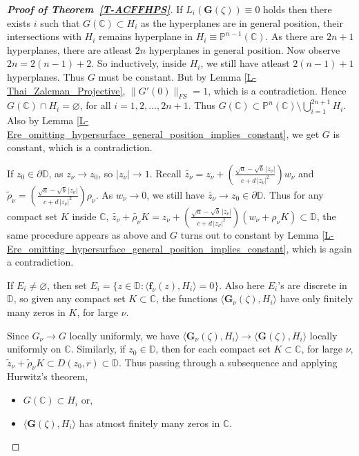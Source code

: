 \documentclass[10pt,a4paper]{amsart}
\begin{document}
\begin{proof}[{\bf Proof of Theorem~\ref{T-ACFFHPS}}]
If $L_i(\mathbf{G}(\zeta))\equiv 0$ holds then there exists $i$ such that $G(\mathbb C)\subset H_i$ as 
the hyperplanes are in general position, their intersections with $H_i$ 
remains hyperplane in $H_i\equiv\mathbb P^{n-1}(\mathbb C)$. As there are $2n+1$ hyperplanes, there are atleast $2n$ hyperplanes in general position. Now observe 
$2n=2(n-1)+2$. So inductively, inside $H_i$, we still have atleast $2(n-1)+1$ hyperplanes. Thus $G$ must be constant. But by Lemma \ref{L-Thai_Zalcman_Projective}, 
$\|G'(0)\|_{FS}=1$, which is a contradiction. Hence $G(\mathbb C)\cap H_i=\varnothing$, for all $i=1,2,\dots,2n+1$.
Thus $G(\mathbb C)\subset \mathbb P^n(\mathbb C)\setminus \bigcup_{i=1}^{2n+1}H_i$. Also by Lemma \ref{L-Ere_omitting_hypersurface_general_position_implies_constant}, we get $G$ is constant, which is a contradiction. \smallskip

If $z_0\in\partial\mathbb D$, as $z_{\nu}\to z_0$, so $|z_{\nu}|\to 1$. Recall 
$\widetilde{z_{\nu}}=z_{\nu}+\left(\frac{\sqrt{a}-\sqrt{b}\,|z_{\nu}|}{c+d\,|z_{\nu}|^2}\right)w_{\nu}$ and 
$\widetilde \rho_{\nu}=\left(\frac{\sqrt{a}-\sqrt{b}\,|z_{\nu}|}{c+d\,|z_{\nu}|^2}\right)\rho_{\nu}$. As $w_{\nu}\to 0$, we 
still have $\widetilde{z_{\nu}}\to z_0\in\partial\mathbb D$. Thus for any compact set $K$ inside $\mathbb C$, 
$\widetilde{z_{\nu}}+\widetilde{\rho_{\nu}}K=z_{\nu}+\left(\frac{\sqrt{a}-\sqrt{b}\,|z_{\nu}|}{c+d\,|z_{\nu}|^2}\right)(w_{\nu}+\rho_{\nu} K)\subset\mathbb D$, 
the same procedure appears as above and $G$ turns out to 
constant by Lemma \ref{L-Ere_omitting_hypersurface_general_position_implies_constant}, which is again a contradiction. \smallskip

If $E_i\neq\varnothing$, then set $E_i=\{z\in\mathbb D:\langle\mathbf{f}_{\nu}(z),H_i\rangle=0\}$. Also here $E_i$'s
are discrete in $\mathbb D$, 
so given any compact set $K\subset \mathbb C$, the functions 
$\langle\mathbf{G}_{\nu}(\zeta),H_i\rangle$ have only finitely many zeros in $K$, for large $\nu$. \smallskip

Since $G_{\nu}\to G$ locally uniformly, we have $\langle\mathbf{G}_{\nu}(\zeta),H_i\rangle\to \langle\mathbf{G}(\zeta),H_i\rangle$ locally uniformly
on $\mathbb C$. Similarly, if $z_0\in\mathbb D$, then for each compact set $K\subset\mathbb C$, for large $\nu$,
$\widetilde z_{\nu} +\widetilde \rho_{\nu} K\subset D(z_0,r)\subset \mathbb D$.
Thus passing through a subsequence and applying Hurwitz's theorem, 
\begin{itemize}
    \item $G(\mathbb C)\subset H_i$ or,
    \item $\langle\mathbf{G}(\zeta),H_i\rangle$ has atmost finitely many zeros in $\mathbb C$.
\end{itemize}


\end{proof}
\end{document}
